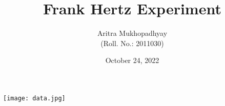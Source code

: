 \documentclass[10pt]{article}
\title{\textbf{Frank Hertz Experiment}}
\author{Aritra Mukhopadhyay\\(Roll. No.: 2011030)}
\date{October 24, 2022}
\begin{document}
    \maketitle
    
    \begin{multicols*}{2}
        
        
        
        
        
        

        
        
        \nocite{*}
    \end{multicols*}

    \newpage
	\texttt{[image: data.jpg]}
\end{document}
